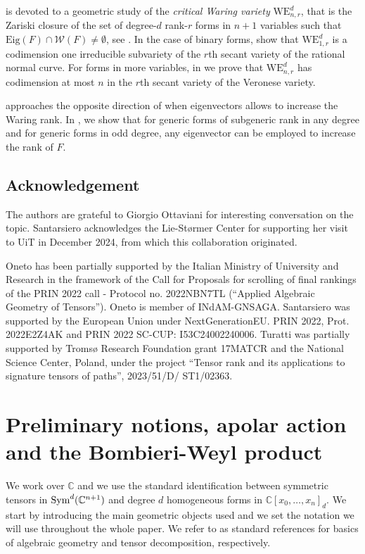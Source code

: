 \documentclass{amsart}
\numberwithin{theorem}{section}
\theoremstyle{definition}
\newcommand{\Eig}{\mathrm{Eig}}
\newcommand{\W}{\mathcal{W}}
\newcommand{\CC}{\mathbb{C}}
\newcommand{\sym}{\mathop{\rm Sym}\nolimits}
\begin{document}
 is devoted to a geometric study of the \textit{critical Waring variety} $\mathrm{WE}^d_{n,r}$, that is the Zariski closure of the set of degree-$d$ rank-$r$ forms in $n+1$ variables such that $\Eig(F) \cap \W(F) \neq \emptyset$, see . In the case of binary forms,  show that $\mathrm{WE}_{1,r}^d$ is a codimension one irreducible subvariety of the $r$th secant variety of the rational normal curve. For forms in more variables, in  we prove that $\mathrm{WE}_{n,r}^d$ has codimension at most $n$ in the $r$th secant variety of the Veronese variety.

 approaches the opposite direction of when eigenvectors allows to increase the Waring rank. In , we show that for generic forms of subgeneric rank in any degree and for generic forms in odd degree, any eigenvector can be employed to increase the rank of $F$.



\subsection*{Acknowledgement}
The authors are grateful to Giorgio Ottaviani for interesting conversation on the topic. Santarsiero acknowledges the Lie-Størmer Center for supporting her visit to UiT in December 2024, from which this collaboration originated.

Oneto has been partially supported by the Italian Ministry of University and Research in the framework of the Call for Proposals for scrolling of final rankings of the PRIN 2022 call - Protocol no. 2022NBN7TL (“Applied Algebraic Geometry of Tensors”). Oneto is member of INdAM-GNSAGA. Santarsiero was supported by the European Union under NextGenerationEU. PRIN 2022, Prot. 2022E2Z4AK and PRIN 2022 SC-CUP: I53C24002240006.
Turatti was partially supported by Troms{\o} Research Foundation grant 17MATCR and the National Science Center, Poland, under the project “Tensor rank and its applications to signature tensors of paths”, 2023/51/D/ ST1/02363.

\section{Preliminary notions, apolar action and the Bombieri-Weyl product}\label{section: prel}
We work over $\CC$  and we use the standard identification between symmetric tensors in $\sym^d(\CC^{n+1})$ and degree $d$ homogeneous forms in $\CC[x_0,\dots,x_n]_{d}$. We start by introducing the main geometric objects used and we set the notation we will use throughout the whole paper. We refer to \cite{Hartshorne,landsberg2011tensors} as standard references for basics of algebraic geometry and tensor decomposition, respectively.
\end{document}
